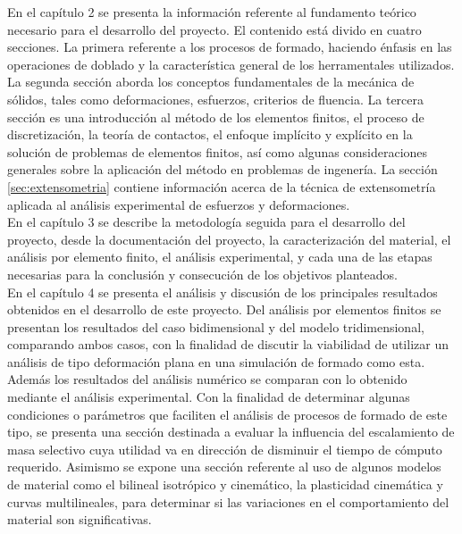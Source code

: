 En el capítulo 2 se presenta la información referente al fundamento teórico necesario para el 
desarrollo del proyecto. El contenido está divido en cuatro secciones. La primera referente 
a los procesos de formado, haciendo énfasis en las operaciones de doblado y la 
característica general de los herramentales utilizados. La segunda sección aborda 
los conceptos fundamentales de la mecánica de sólidos, tales como deformaciones, esfuerzos, 
criterios de fluencia. La tercera sección es una introducción al método de los elementos finitos, 
el proceso de discretización, la teoría de contactos, el enfoque implícito y explícito en 
la solución de problemas de elementos finitos, así como algunas consideraciones generales 
sobre la aplicación del método en problemas de ingenería. La sección \ref{sec:extensometria} 
contiene información acerca de la técnica de extensometría aplicada al análisis experimental 
de esfuerzos y deformaciones. \\

En el capítulo 3 se describe la metodología seguida para el desarrollo del proyecto, 
desde la documentación del proyecto, la caracterización del material, el análisis por 
elemento finito, el análisis experimental, y cada una de las etapas necesarias para 
la conclusión y consecución de los objetivos planteados.\\

En el capítulo 4 se presenta el análisis y discusión de los principales resultados 
obtenidos en el desarrollo de este proyecto. Del análisis por elementos finitos 
se presentan los resultados del caso bidimensional y del modelo tridimensional, comparando 
ambos casos, con la finalidad de discutir la viabilidad de utilizar un análisis de tipo 
deformación plana en una simulación de formado como esta. Además los resultados del 
análisis numérico se comparan con lo obtenido mediante el análisis experimental.
Con la finalidad de determinar algunas condiciones o parámetros que faciliten 
el análisis de procesos de formado de este tipo, se presenta una sección destinada 
a evaluar la influencia del escalamiento de masa selectivo cuya utilidad va en 
dirección de disminuir el tiempo de cómputo requerido. Asimismo se expone una sección 
referente al uso de algunos modelos de material como el bilineal isotrópico y cinemático, 
la plasticidad cinemática y curvas multilineales, para determinar si las variaciones 
en el comportamiento del material son significativas.\\

